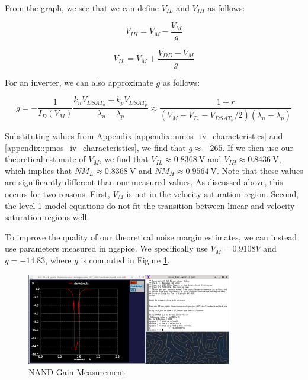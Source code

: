\documentclass{article}
\begin{document}
	\noindent From the graph, we see that we can define $V_{IL}$ and $V_{IH}$ as follows:
	
	\begin{equation}
		\label{eq::vih_theory}
		V_{IH} = V_{M} - \frac{V_M}{g}
	\end{equation}
	
	\begin{equation}
		\label{eq::vil_theory}
		V_{IL} = V_{M} + \frac{V_{DD} - V_M}{g}
	\end{equation}
	
	\noindent For an inverter, we can also approximate $g$ as follows:
	
	\begin{equation}
		\label{eq::g_theory}
		g = -\frac{1}{I_D(V_M)}\frac{k_nV_{DSAT_n} + k_pV_{DSAT_p}}{\lambda_n - \lambda_p} \approx \frac{1 + r}{(V_M - V_{T_n} - V_{DSAT_n}/2)(\lambda_n - \lambda_p)}
	\end{equation}
	
	\noindent Substituting values from Appendix \ref{appendix::nmos_iv_characteristics} and \ref{appendix::pmos_iv_characteristics}, we find that $g \approx -265$. If we then use our theoretical estimate of $V_{M}$, we find that $V_{IL} \approx 0.8368\ \text{V}$ and $V_{IH} \approx 0.8436\ \text{V}$, which implies that $NM_L \approx 0.8368\ \text{V}$ and $NM_H \approx 0.9564\ \text{V}$. Note that these values are significantly different than our measured values. As discussed above, this occurs for two reasons. First, $V_M$ is not in the velocity saturation region. Second, the level 1 model equations do not fit the transition between linear and velocity saturation regions well.
	
	To improve the quality of our theoretical noise margin estimates, we can instead use parameters measured in ngspice. We specifically use $V_M = 0.9108 V$ and $g = -14.83$, where $g$ is computed in Figure \ref{fig::nand_noise_analysis_g_sweep_va_vb}.
	
	\begin{figure}[H]
		\centerline{\includegraphics[width=0.8\textwidth]{nand_noise_analysis_g_sweep_va_vb.png}}
		\caption{NAND Gain Measurement}
		\label{fig::nand_noise_analysis_g_sweep_va_vb}
	\end{figure}
	
\end{document}

